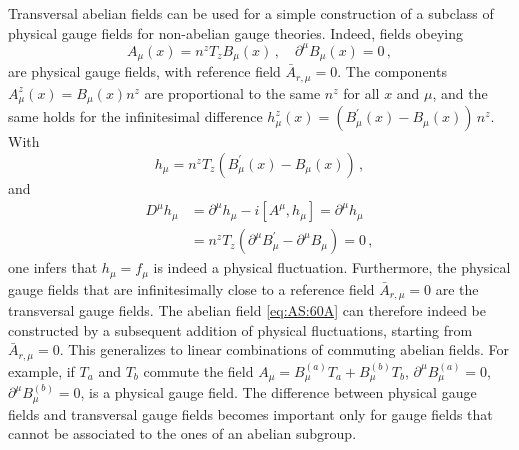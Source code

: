 \documentclass[twocolumn,aps,prd,amsmath,amssymb,preprintnumbers,longbibliography]{revtex4-1}
\numberwithin{equation}{section}
\begin{document}
Transversal abelian fields can be used for a simple construction of a subclass of physical gauge fields for non-abelian gauge theories. Indeed, fields obeying
\begin{equation}\label{eq:AS:60A} 
A_{\mu}(x)=n^{z}T_{z}B_{\mu}(x)\, ,\quad \partial^{\mu}B_{\mu}(x)=0\, ,
\end{equation}
are physical gauge fields, with reference field $\bar{A}_{r,\mu}=0$. The components $A_{\mu}^{z}(x)=B_{\mu}(x)n^{z}$ are proportional to the same $n^{z}$ for all $x$ and $\mu$, and the same holds for the infinitesimal difference $h_{\mu}^{z}(x)=(B_{\mu}^{\prime}(x)-B_{\mu}(x))\, n^{z}$. With
\begin{equation}\label{eq:AS:60B}
h_{\mu}=n^{z}T_{z}\left (B_{\mu}^{\prime}(x)-B_{\mu}(x)\right )\, ,
\end{equation}
and
\begin{align}\label{eq:AS:60C}
D^{\mu}h_{\mu}&=\partial^{\mu}h_{\mu}-i[A^{\mu},h_{\mu}]=\partial^{\mu}h_{\mu}\nonumber\\
&=n^{z}T_{z}\left (\partial^{\mu}B^{\prime}_{\mu}-\partial^{\mu}B_{\mu}\right )=0\, ,
\end{align}
one infers that $h_{\mu}=f_{\mu}$ is indeed a physical fluctuation. Furthermore, the physical gauge fields that are infinitesimally close to a reference field $\bar{A}_{r,\mu}=0$ are the transversal gauge fields. The abelian field \eqref{eq:AS:60A} can therefore indeed be constructed by a subsequent addition of physical fluctuations, starting from $\bar{A}_{r,\mu}=0$. This generalizes to linear combinations of commuting abelian fields. For example, if $T_{a}$ and $T_{b}$ commute the field $A_{\mu}=B_{\mu}^{(a)}T_{a}+B_{\mu}^{(b)}T_{b}$, $\partial^{\mu}B_{\mu}^{(a)}=0$, $\partial^{\mu}B_{\mu}^{(b)}=0$, is a physical gauge field. The difference between physical gauge fields and transversal gauge fields becomes important only for gauge fields that cannot be associated to the ones of an abelian subgroup.
\end{document}
